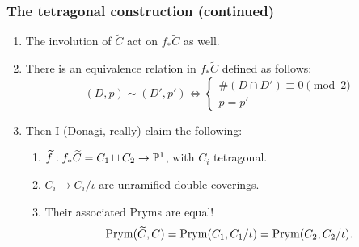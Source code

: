 \begin{frame}
\frametitle{The tetragonal construction (continued)}

\begin{enumerate}
	\item The involution of $\widetilde C$ act on $f_\ast \widetilde C$ as well.
	\pause
	\item There is an equivalence relation in $f_\ast \widetilde C$ defined as follows:
	\[
	(D,p) \sim (D',p') \Leftrightarrow
	\begin{cases}
	\#(D \cap D') \equiv 0 \pmod 2 \\
	p = p'
	\end{cases}
	\]
	\pause
	\item Then I (Donagi, really) claim the following:
	\begin{enumerate}
		\item $\widetilde f: f_\ast \widetilde C = C_1 \sqcup C_2 \to \P^1$, with $C_i$ tetragonal.
		\item $C_i \to C_i/\iota$ are unramified double coverings.
		\item Their associated Pryms are equal!
		\[
		\Prym(\widetilde C, C)=\Prym(C_1,C_1/\iota)=\Prym(C_2,C_2/\iota).
		\]
	\end{enumerate}
\end{enumerate}



\end{frame}
